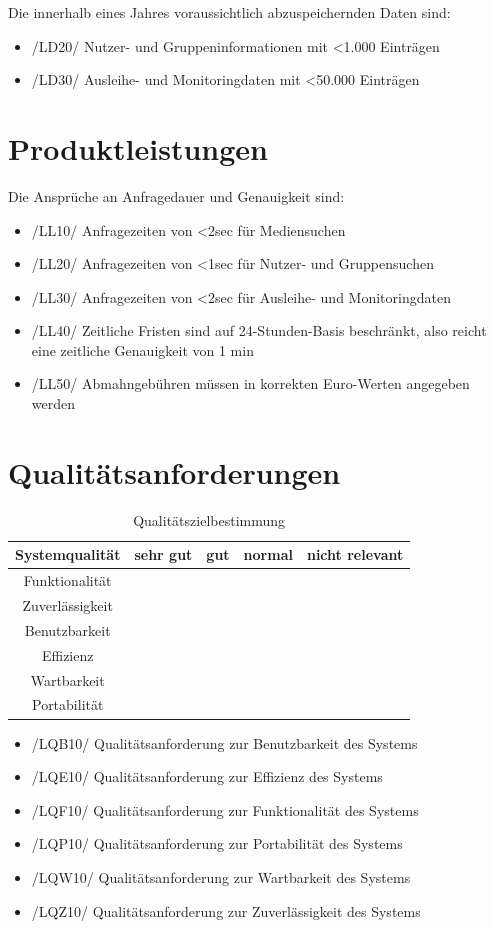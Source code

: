 \documentclass[12pt, a4paper]{article}
\begin{document}
Die innerhalb eines Jahres voraussichtlich abzuspeichernden Daten sind:
\begin{itemize}
	\item /LD20/ Nutzer- und Gruppeninformationen mit <1.000 Einträgen
	\item /LD30/ Ausleihe- und Monitoringdaten mit <50.000 Einträgen
\end{itemize}

\section{Produktleistungen}
Die Ansprüche an Anfragedauer und Genauigkeit sind:
\begin{itemize}
	\item /LL10/ Anfragezeiten von <2sec für Mediensuchen
	\item /LL20/ Anfragezeiten von <1sec für Nutzer- und Gruppensuchen
	\item /LL30/ Anfragezeiten von <2sec für Ausleihe- und Monitoringdaten
	\item /LL40/ Zeitliche Fristen sind auf 24-Stunden-Basis beschränkt, also reicht eine zeitliche Genauigkeit von 1 min
	\item /LL50/ Abmahngebühren müssen in korrekten Euro-Werten angegeben werden
\end{itemize}

\section{Qualitätsanforderungen}
\newcommand{\xmark}{\ding{55}}%
\begin{table}[h]
	\centering
\begin{tabular}{ || c | c | c | c | c || }
	\hline
	Systemqualität & sehr gut & gut & normal & nicht relevant  \\ \hline
	Funktionalität &  & \xmark &  &  \\ \hline
	Zuverlässigkeit &  & \xmark &  &  \\ \hline
	Benutzbarkeit &  \xmark & &  &  \\ \hline
	Effizienz &  &  & \xmark  &  \\ \hline
	Wartbarkeit &  &  & \xmark &  \\ \hline
	Portabilität &  &  &  & \xmark \\
	\hline
\end{tabular}
\caption{Qualitätszielbestimmung}
\label{table:qualitätsanforderungen}
\end{table}
\begin{itemize}
	\item /LQB10/ Qualitätsanforderung zur Benutzbarkeit des Systems
	\item /LQE10/ Qualitätsanforderung zur Effizienz des Systems
	\item /LQF10/ Qualitätsanforderung zur Funktionalität des Systems
	\item /LQP10/ Qualitätsanforderung zur Portabilität des Systems
	\item /LQW10/ Qualitätsanforderung zur Wartbarkeit des Systems
	\item /LQZ10/ Qualitätsanforderung zur Zuverlässigkeit des Systems
\end{itemize}
\end{document}
